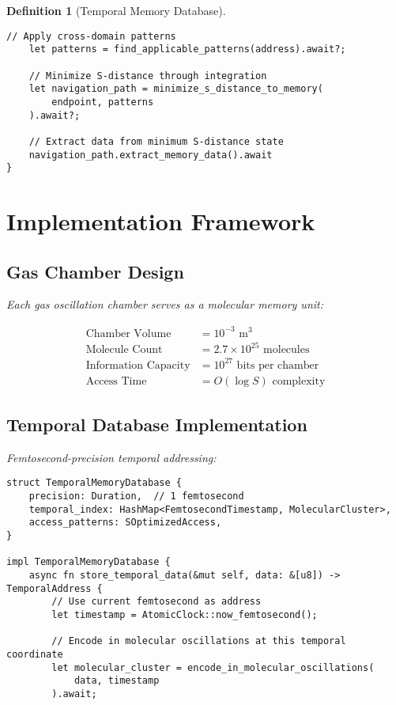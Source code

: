 \documentclass[12pt]{article}
\newtheorem{definition}[theorem]{Definition}
\begin{document}
\begin{definition}[Temporal Memory Database]
\begin{lstlisting}[caption=S-Optimized Memory Access]
    // Apply cross-domain patterns
    let patterns = find_applicable_patterns(address).await?;
    
    // Minimize S-distance through integration
    let navigation_path = minimize_s_distance_to_memory(
        endpoint, patterns
    ).await?;
    
    // Extract data from minimum S-distance state
    navigation_path.extract_memory_data().await
}
\end{lstlisting}

\section{Implementation Framework}

\subsection{Gas Chamber Design}

Each gas oscillation chamber serves as a molecular memory unit:

\begin{align}
\text{Chamber Volume} &= 10^{-3} \text{ m}^3 \\
\text{Molecule Count} &= 2.7 \times 10^{25} \text{ molecules} \\
\text{Information Capacity} &= 10^{27} \text{ bits per chamber} \\
\text{Access Time} &= O(\log S) \text{ complexity}
\end{align}

\subsection{Temporal Database Implementation}

Femtosecond-precision temporal addressing:

\begin{lstlisting}[caption=Temporal Database Implementation]
struct TemporalMemoryDatabase {
    precision: Duration,  // 1 femtosecond
    temporal_index: HashMap<FemtosecondTimestamp, MolecularCluster>,
    access_patterns: SOptimizedAccess,
}

impl TemporalMemoryDatabase {
    async fn store_temporal_data(&mut self, data: &[u8]) -> TemporalAddress {
        // Use current femtosecond as address
        let timestamp = AtomicClock::now_femtosecond();
        
        // Encode in molecular oscillations at this temporal coordinate
        let molecular_cluster = encode_in_molecular_oscillations(
            data, timestamp
        ).await;
        

\end{lstlisting}
\end{definition}
\end{document}
